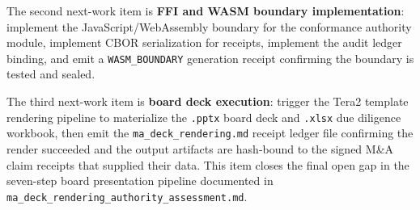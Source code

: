 The second next-work item is \textbf{FFI and WASM boundary implementation}: implement
the JavaScript/WebAssembly boundary for the conformance authority module, implement
CBOR serialization for receipts, implement the audit ledger binding, and emit a
\texttt{WASM\_BOUNDARY} generation receipt confirming the boundary is tested and sealed.

The third next-work item is \textbf{board deck execution}: trigger the Tera2 template
rendering pipeline to materialize the \texttt{.pptx} board deck and \texttt{.xlsx}
due diligence workbook, then emit the \texttt{ma\_deck\_rendering.md} receipt ledger
file confirming the render succeeded and the output artifacts are hash-bound to the
signed M\&A claim receipts that supplied their data. This item closes the final open
gap in the seven-step board presentation pipeline documented in
\texttt{ma\_deck\_rendering\_authority\_assessment.md}.
